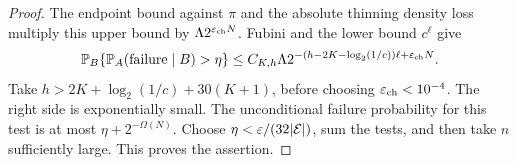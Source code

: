 \begin{proof}
The endpoint bound against \(\pi\) and the absolute thinning
density loss multiply this upper bound by
\(\Lambda2^{\varepsilon_{\rm ch}N}\).  Fubini and the lower
bound \(c^\ell\) give
\[
 \mathbb P_B\{\mathbb P_A(\mathrm{failure}\mid B)>\eta\}
 \le C_{K,h}\Lambda
 2^{-(h-2K-\log_2(1/c))\ell+\varepsilon_{\rm ch}N}.
\]
Take
\(h>2K+\log_2(1/c)+30(K+1)\), before choosing
\(\varepsilon_{\rm ch}<10^{-4}\).  The right side is
exponentially small.  The unconditional failure probability
for this test is at most \(\eta+2^{-\Omega(N)}\).
Choose \(\eta<\varepsilon/(32|\mathcal E|)\), sum the tests, and then take
\(n\) sufficiently large.  This proves the assertion.
\end{proof}
